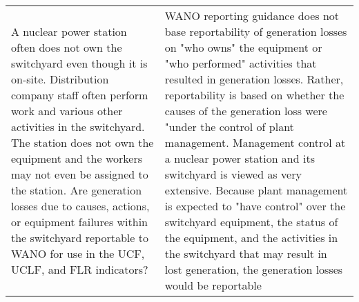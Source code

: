 \begin{longtable}{p{7cm}p{7cm}}
    A nuclear power station often does not own the switchyard even
  though it is on-site. Distribution company staff often perform work
  and various other activities in the switchyard. The station does not
  own the equipment and the workers may not even be assigned to the
  station. Are generation losses due to causes, actions, or equipment
  failures within the switchyard reportable to WANO for use in the
  UCF, UCLF, and FLR indicators? &
    WANO reporting guidance does not base reportability of generation
                                   losses on "who owns" the equipment
                                   or "who performed" activities that
                                   resulted in generation
                                   losses. Rather, reportability is
                                   based on whether the causes of the
                                   generation loss were "under the
                                   control of plant management.
Management control at a nuclear power station and its switchyard
  is viewed as very extensive. Because plant management is expected to
  "have control" over the switchyard equipment, the status of the
  equipment, and the activities in the switchyard that may result in
  lost generation, the generation losses would be reportable\\


\end{longtable}
